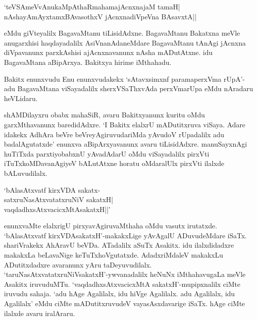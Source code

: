 \begin{shloka}
`teVSAmeVvAnukaMpAthaRmahamajAcnxnajaM tamaH|\\
nAshayAmAyxtamxBAvasothxV jAcnxnadiVpeVna BAsavxtA||
\end{shloka}

eMdu giVteyalilx BagavaMtanu tiLisidAdxne. BagavaMtanu Bakatxna meVle anugarxhisi haqdayadalilx AsiVnanAdaneMdare BagavaMtanu tAnAgi jAcnxna 
diVpavanunx parxkAshisi ajAcnxnavanunx nAsha mADutAtxne. idu BagavaMtana aBipArxya. Bakitxya hirime iMthahadu.

Bakitx enunxvudu Enu enunxvudakekx `sAtavxsimxnf paramaperxVma rUpA'-adu BagavaMtana viSayadalilx sherxVSaThxvAda perxVmarUpa eMdu nAradaru heVLidaru.

shAMDilayxru obabx mahaSiR, avaru Bakitxyanunx kuritu oMdu garxMthavanunx baredidAdxre. `I Bakitx elalxrU mADutitxruva viSaya. Adare idakekx AdhAra beVre 
beVreyAgiruvudariMda yAvudoV rUpadalilx adu badalAgutatxde' enunxva aBipArxyavanunx avaru tiLisidAdxre. manuSayxnAgi huTiTxda parxtiyobabxnU 
yAvadAdarU oMdu viSayadalilx pirxVti iTuTxkoMDavanAgiyeV bALutAtxne horatu oMdaralUlx pirxVti ilalxde bALuvudilalx.

\begin{shloka}
`bAlasAtxvatf kirxVDA sakatx-\\
satxruNasAtxvatatxruNiV sakatxH|\\
vaqdadhxsAtxvacicxMtAsakatxH||'
\end{shloka}

enunxvaMte elalxrigU pirxyavAgiruvaMthaha oMdu vasutx irutatxde. `bAlasAtxvatf kirxVDAsakatxH'-makakxLige yAvAgalU ADuvudeMdare iSaTx. shariVrakekx AhAravU beVDa. 
ATadalilx aSuTx Asakitx. idu ilalxdidadxre makakxLa beLavaNige keTuTxhoVgutatxde. AdadxriMdaleV makakxLu ADutitxdadxre avaranunx yAru taDeyuvudilalx. 
`taruNasAtxvatatxruNiVsakatxH'-ywvanadalilx heNuNx iMthahavugaLa meVle Asakitx iruvuduMTu. `vaqdadhxsAtxvacicxMtA sakatxH'-mupipxnalilx ciMte iruvudu sahaja. `adu hAge Agalilalx, idu hiVge Agalilalx. adu Agalilalx, idu Agalilalx' eMdu ciMte mADutitxruvudeV vayasAsxdavarige iSaTx. hAge ciMte ilalxde avaru iralAraru.

